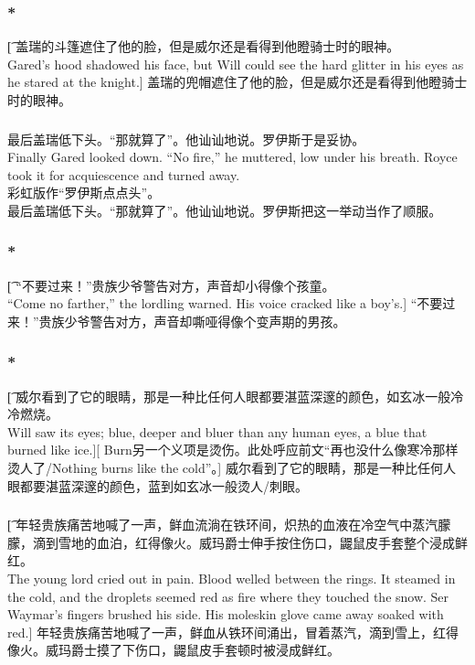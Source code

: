 \documentclass[12pt,a4paper]{article}
\begin{document}
\subsubsection{\color{red}*}\t[	
	盖瑞的斗篷遮住了他的脸，但是威尔还是看得到他瞪骑士时的眼神。\\
	Gared's hood shadowed his face, but Will could see the hard glitter in his eyes as he stared at the knight.]
	盖瑞的兜帽遮住了他的脸，但是威尔还是看得到他瞪骑士时的眼神。
	
\subsubsection{}{\color{blue}	
最后盖瑞低下头。“那就算了”。他讪讪地说。罗伊斯于是妥协。\\
Finally Gared looked down. “No fire,” he muttered, low under his breath. Royce took it for acquiescence and turned away.}\\
{\color{red}彩虹版作“罗伊斯点点头”。}\\
最后盖瑞低下头。“那就算了”。他讪讪地说。罗伊斯把这一举动当作了顺服。
	
\subsubsection{\color{red}*}\t[		
	“不要过来！”贵族少爷警告对方，声音却小得像个孩童。\\
	“Come no farther,” the lordling warned. His voice cracked like a boy's.]
	“不要过来！”贵族少爷警告对方，声音却嘶哑得像个变声期的男孩。

\subsubsection{\color{red}*}\t[		
	威尔看到了它的眼睛，那是一种比任何人眼都要湛蓝深邃的颜色，如玄冰一般冷冷燃烧。\\
	Will saw its eyes; blue, deeper and bluer than any human eyes, a blue that burned like ice.][
	Burn另一个义项是烫伤。此处呼应前文“再也没什么像寒冷那样烫人了/Nothing burns like the cold”。]	
	威尔看到了它的眼睛，那是一种比任何人眼都要湛蓝深邃的颜色，蓝到如玄冰一般烫人/刺眼。
	
\subsubsection{}\t[		
	年轻贵族痛苦地喊了一声，鲜血流淌在铁环间，炽热的血液在冷空气中蒸汽朦朦，滴到雪地的血泊，红得像火。威玛爵士伸手按住伤口，鼹鼠皮手套整个浸成鲜红。\\
	The young lord cried out in pain. Blood welled between the rings. It steamed in the cold, and the droplets seemed red as fire where they touched the snow. Ser Waymar's fingers brushed his side. His moleskin glove came away soaked with red.]
	年轻贵族痛苦地喊了一声，鲜血从铁环间涌出，冒着蒸汽，滴到雪上，红得像火。威玛爵士摸了下伤口，鼹鼠皮手套顿时被浸成鲜红。
\end{document}
